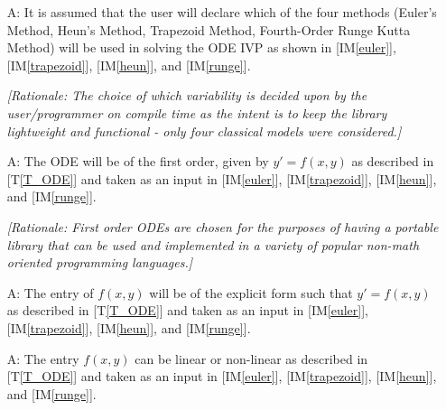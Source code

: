 \documentclass[12pt]{article}
\newcommand{\tref}[1]{T\ref{#1}}
\newcounter{assumpnum} %
\newcommand{\iref}[1]{IM\ref{#1}}
\begin{document}
\begin{itemize}


\item[A\refstepcounter{assumpnum}\theassumpnum \label{A_programcalls}:]
It is assumed that the user will declare which of the four methods (Euler's Method, Heun's
Method, Trapezoid Method, Fourth-Order Runge Kutta Method) will be used in solving
the ODE IVP as shown in [\iref{euler}], [\iref{trapezoid}], [\iref{heun}], and [\iref{runge}].

\textit{[Rationale: The choice of which variability is decided upon by the user/programmer
on compile time as the intent is to keep the library lightweight and functional - only four
classical models were considered.]}

\item[A\refstepcounter{assumpnum}\theassumpnum \label{A_typeoff}:]
The ODE will be of the first order, given by $y' = f(x, y)$ as described in [\tref{T_ODE}] and taken as an input in
[\iref{euler}], [\iref{trapezoid}], [\iref{heun}], and [\iref{runge}].

\textit{[Rationale: First order ODEs are chosen for the purposes of having a portable
library that can be used and implemented in a variety of popular non-math oriented programming
languages.]}

\item[A\refstepcounter{assumpnum}\theassumpnum \label{A_explicit}:]
The entry of $f(x, y)$ will be of the explicit form such that $y' = f(x, y)$
as described in [\tref{T_ODE}] and taken as an input in
[\iref{euler}], [\iref{trapezoid}], [\iref{heun}], and [\iref{runge}].

\item[A\refstepcounter{assumpnum}\theassumpnum \label{A_linearity}:]
The entry $f(x, y)$ can be linear or non-linear
as described in [\tref{T_ODE}] and taken as an input in
[\iref{euler}], [\iref{trapezoid}], [\iref{heun}], and [\iref{runge}].


\end{itemize}
\end{document}

